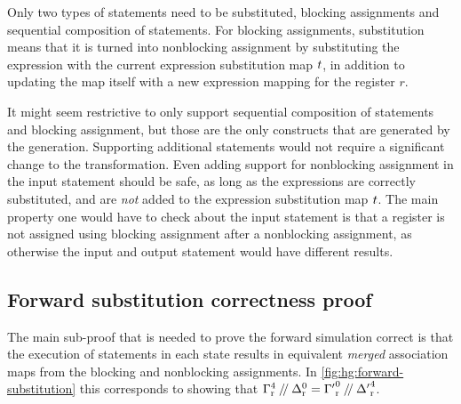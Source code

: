 \begin{definition}%
  \label{def:substitute-statements}

  Only two types of statements need to be substituted, blocking assignments and
  sequential composition of statements.  For blocking assignments, substitution
  means that it is turned into nonblocking assignment by substituting the
  expression with the current expression substitution map $t$, in
  addition to updating the map itself with a new expression mapping for the
  register $r$.

\end{definition}

It might seem restrictive to only support sequential composition of statements
and blocking assignment, but those are the only constructs that are generated by
the \htl{} generation.  Supporting additional statements would not require a
significant change to the transformation.  Even adding support for nonblocking
assignment in the input statement should be safe, as long as the expressions are
correctly substituted, and are \emph{not} added to the expression substitution
map $t$.  The main property one would have to check about the input
statement is that a register is not assigned using blocking assignment after a
nonblocking assignment, as otherwise the input and output statement would have
different results.

\subsection{Forward substitution correctness proof}%
\label{sec:hg:forward-substitution-correctness-proof}

The main sub-proof that is needed to prove the forward simulation correct is
that the execution of statements in each state results in equivalent
\emph{merged} association maps from the blocking and nonblocking assignments.
In \cref{fig:hg:forward-substitution} this corresponds to showing that
${\Gamma}^{4}_{\mathrm r} \mathbin{/\kern-2pt/} \Delta^{0}_{\mathrm r} =
{\Gamma'}^{0}_{\mathrm r} \mathbin{/\kern-2pt/} {\Delta'}^4_{\mathrm r}$.

